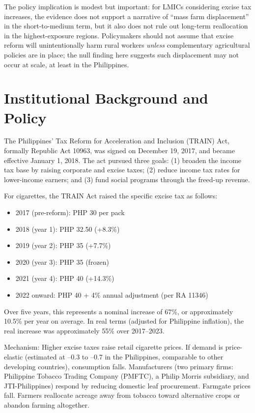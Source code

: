 \documentclass[12pt]{article}
\begin{document}
The policy implication is modest but important: for LMICs considering excise tax increases, the evidence does not support a narrative of ``mass farm displacement'' in the short-to-medium term, but it also does not rule out long-term reallocation in the highest-exposure regions. Policymakers should not assume that excise reform will unintentionally harm rural workers \emph{unless} complementary agricultural policies are in place; the null finding here suggests such displacement may not occur at scale, at least in the Philippines.

\section{Institutional Background and Policy}

The Philippines' Tax Reform for Acceleration and Inclusion (TRAIN) Act, formally Republic Act 10963, was signed on December 19, 2017, and became effective January 1, 2018. The act pursued three goals: (1) broaden the income tax base by raising corporate and excise taxes; (2) reduce income tax rates for lower-income earners; and (3) fund social programs through the freed-up revenue.

For cigarettes, the TRAIN Act raised the specific excise tax as follows:
\begin{itemize}
\item 2017 (pre-reform): PHP 30 per pack
\item 2018 (year 1): PHP 32.50 (+8.3\%)
\item 2019 (year 2): PHP 35 (+7.7\%)
\item 2020 (year 3): PHP 35 (frozen)
\item 2021 (year 4): PHP 40 (+14.3\%)
\item 2022 onward: PHP 40 + 4\% annual adjustment (per RA 11346)
\end{itemize}

Over five years, this represents a nominal increase of 67\%, or approximately 10.5\% per year on average. In real terms (adjusted for Philippine inflation), the real increase was approximately 55\% over 2017--2023.

Mechanism: Higher excise taxes raise retail cigarette prices. If demand is price-elastic (estimated at --0.3 to --0.7 in the Philippines, comparable to other developing countries), consumption falls. Manufacturers (two primary firms: Philippine Tobacco Trading Company (PMFTC), a Philip Morris subsidiary, and JTI-Philippines) respond by reducing domestic leaf procurement. Farmgate prices fall. Farmers reallocate acreage away from tobacco toward alternative crops or abandon farming altogether.
\end{document}
